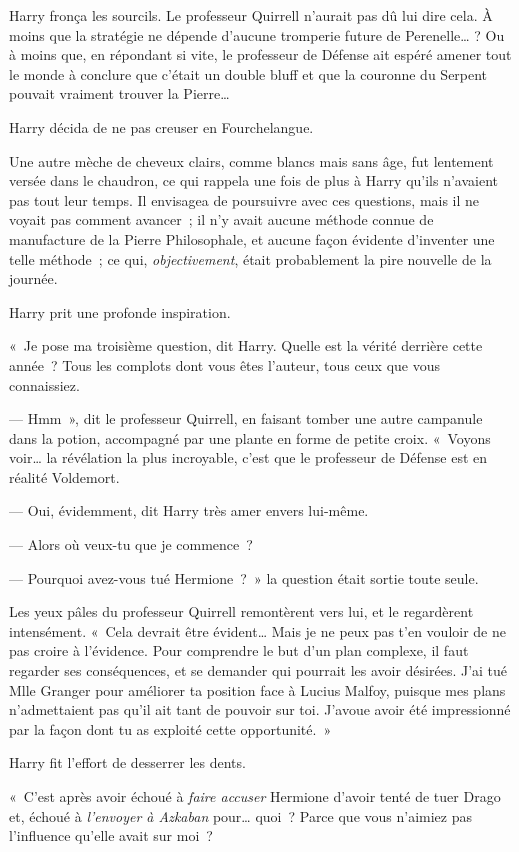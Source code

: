 Harry fronça les sourcils.
Le professeur Quirrell n'aurait pas dû lui dire cela.
À moins que la stratégie ne dépende d'aucune tromperie future de Perenelle…
? Ou à moins que, en répondant si vite, le professeur de Défense ait espéré amener tout le monde à conclure que c'était un double bluff et que la couronne du Serpent pouvait vraiment trouver la Pierre…

Harry décida de ne pas creuser en Fourchelangue.

Une autre mèche de cheveux clairs, comme blancs mais sans âge, fut lentement versée dans le chaudron, ce qui rappela une fois de plus à Harry qu'ils n'avaient pas tout leur temps.
Il envisagea de poursuivre avec ces questions, mais il ne voyait pas comment avancer~; il n'y avait aucune méthode connue de manufacture de la Pierre Philosophale, et aucune façon évidente d'inventer une telle méthode~; ce qui, \emph{objectivement}, était probablement la pire nouvelle de la journée.

Harry prit une profonde inspiration.

«~Je pose ma troisième question, dit Harry.
Quelle est la vérité derrière cette année~?
Tous les complots dont vous êtes l'auteur, tous ceux que vous connaissiez.

--- Hmm~», dit le professeur Quirrell, en faisant tomber une autre campanule dans la potion, accompagné par une plante en forme de petite croix.
«~Voyons voir… la révélation la plus incroyable, c'est que le professeur de Défense est en réalité Voldemort.

--- Oui, évidemment, dit Harry très amer envers lui-même.

--- Alors où veux-tu que je commence~?

--- Pourquoi avez-vous tué Hermione~?~»
la question était sortie toute seule.

Les yeux pâles du professeur Quirrell remontèrent vers lui, et le regardèrent intensément.
«~Cela devrait être évident…
Mais je ne peux pas t'en vouloir de ne pas croire à l'évidence.
Pour comprendre le but d'un plan complexe, il faut regarder ses conséquences, et se demander qui pourrait les avoir désirées.
J'ai tué Mlle Granger pour améliorer ta position face à Lucius Malfoy, puisque mes plans n'admettaient pas qu'il ait tant de pouvoir sur toi.
J'avoue avoir été impressionné par la façon dont tu as exploité cette opportunité.~»

Harry fit l'effort de desserrer les dents.

«~C'est après avoir échoué à \emph{faire accuser} Hermione d'avoir tenté de tuer Drago et, échoué à \emph{l'envoyer à Azkaban} pour… quoi~?
Parce que vous n'aimiez pas l'influence qu'elle avait sur moi~?

